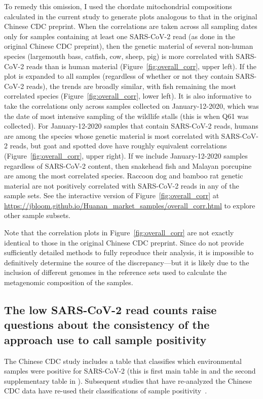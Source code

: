 \documentclass[9pt,twocolumn,twoside]{gsajnl_modified}
\begin{document}
To remedy this omission, I used the chordate mitochondrial compositions calculated in the current study to generate plots analogous to that in the original Chinese CDC preprint.
When the correlations are taken across all sampling dates only for samples containing at least one SARS-CoV-2 read (as done in the original Chinese CDC preprint), then the genetic material of several non-human species (largemouth bass, catfish, cow, sheep, pig) is more correlated with SARS-CoV-2 reads than is human material (Figure~\ref{fig:overall_corr}, upper left).
If the plot is expanded to all samples (regardless of whether or not they contain SARS-CoV-2 reads), the trends are broadly similar, with fish remaining the most correlated species (Figure~\ref{fig:overall_corr}, lower left).
It is also informative to take the correlations only across samples collected on January-12-2020, which was the date of most intensive sampling of the wildlife stalls (this is when Q61 was collected).
 For January-12-2020 samples that contain SARS-CoV-2 reads, humans are among the species whose genetic material is most correlated with SARS-CoV-2 reads, but goat and spotted dove have roughly equivalent correlations (Figure~\ref{fig:overall_corr}, upper right).
 If we include January-12-2020 samples regardless of SARS-CoV-2 content, then snakehead fish and Malayan porcupine are among the most correlated species.
Raccoon dog and bamboo rat genetic material are not positively correlated with SARS-CoV-2 reads in any of the sample sets.
See the interactive version of Figure~\ref{fig:overall_corr} at \url{https://jbloom.github.io/Huanan_market_samples/overall_corr.html} to explore other sample subsets.

Note that the correlation plots in Figure~\ref{fig:overall_corr} are not exactly identical to those in the original Chinese CDC preprint.
Since \citet{liu2022surveillance} do not provide sufficiently detailed methods to fully reproduce their analysis, it is impossible to definitively determine the source of the discrepancy---but it is likely due to the inclusion of different genomes in the reference sets used to calculate the metagenomic composition of the samples.

\subsection{The low SARS-CoV-2 read counts raise questions about the consistency of the approach use to call sample positivity}
The Chinese CDC study includes a table that classifies which environmental samples were positive for SARS-CoV-2 (this is first main table in \citet{liu2022surveillance} and the second supplementary table in \citet{liu2023surveillance}).
Subsequent studies that have re-analyzed the Chinese CDC data have re-used their classifications of sample positivity~\citep{worobey2022huanan,courtier2022sars,crits2023genetic}.
\end{document}

